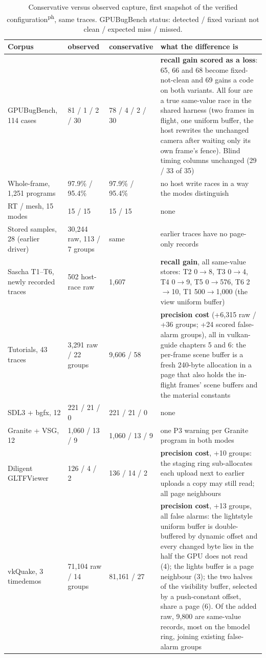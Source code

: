 \documentclass[acmtog,anonymous,review]{acmart}
\newcommand{\posthoc}{\textsuperscript{\textsf{ph}}}
\begin{document}
\begin{table}[t]
\caption{Conservative versus observed capture, first snapshot of the verified configuration\posthoc, same traces. GPUBugBench status: detected / fixed
variant not clean / expected miss / missed.}
\label{tab:s-capcost}
\small
\begin{tabular}{@{}p{}p{}p{}p{}@{}}
\toprule
Corpus & observed & conservative & what the difference is \\
\midrule
GPUBugBench, 114 cases & 81 / 1 / 2 / 30 & 78 / 4 / 2 / 30 & \textbf{recall gain scored as a loss}: 65, 66 and 68 become fixed-not-clean and 69 gains a code on both variants. All four are a true same-value race in the shared harness (two frames in flight, one uniform buffer, the host rewrites the unchanged camera after waiting only its own frame's fence). Blind timing columns unchanged (29 / 33 of 35) \\
Whole-frame, 1,251 programs & 97.9\% / 95.4\% & 97.9\% / 95.4\% & no host write races in a way the modes distinguish \\
RT / mesh, 15 modes & 15 / 15 & 15 / 15 & none \\
Stored samples, 28 (earlier driver) & 30,244 raw, 113 / 7 groups & same & earlier traces have no page-only records \\
Sascha T1--T6, newly recorded traces & 502 host-race raw & 1,607 & \textbf{recall gain}, all same-value stores: T2 0$\to$8, T3 0$\to$4, T4 0$\to$9, T5 0$\to$576, T6 2$\to$10, T1 500$\to$1,000 (the view uniform buffer) \\
Tutorials, 43 traces & 3,291 raw / 22 groups & 9,606 / 58 & \textbf{precision cost} (+6,315 raw / +36 groups; +24 scored false-alarm groups), all in vulkan-guide chapters 5 and 6: the per-frame scene buffer is a fresh 240-byte allocation in a page that also holds the in-flight frames' scene buffers and the material constants \\
SDL3 + bgfx, 12 & 221 / 21 / 0 & 221 / 21 / 0 & none \\
Granite + VSG, 12 & 1,060 / 13 / 9 & 1,060 / 13 / 9 & one P3 warning per Granite program in both modes \\
Diligent GLTFViewer & 126 / 4 / 2 & 136 / 14 / 2 & \textbf{precision cost}, +10 groups: the staging ring sub-allocates each upload next to earlier uploads a copy may still read; all page neighbours \\
vkQuake, 3 timedemos & 71,104 raw / 14 groups & 81,161 / 27 & \textbf{precision cost}, +13 groups, all false alarms: the lightstyle uniform buffer is double-buffered by dynamic offset and every changed byte lies in the half the GPU does not read (4); the lights buffer is a page neighbour (3); the two halves of the visibility buffer, selected by a push-constant offset, share a page (6). Of the added raw, 9,800 are same-value records, most on the bmodel ring, joining existing false-alarm groups \\
\bottomrule
\end{tabular}
\end{table}
\end{document}
